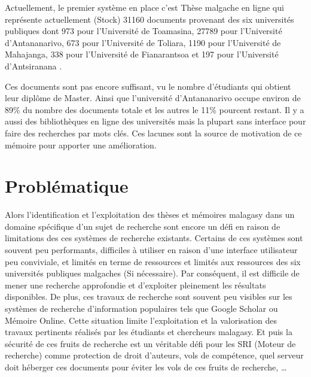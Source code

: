 Actuellement, le premier système en place c'est \og Thèse malgache en ligne \fg{} qui représente actuellement (Stock) 31160 documents provenant des six universités publiques dont 973 pour l'Université de Toamasina, 27789 pour l'Université d'Antananarivo, 673 pour l'Université de Toliara, 1190 pour l'Université de Mahajanga, 338 pour l'Université de Fianarantsoa et 197 pour l'Université d'Antsiranana \citep{these-malgache-en-ligne}.

Ces documents sont pas encore suffisant, vu le nombre d’étudiants qui obtient leur diplôme de Master. Ainsi que l'université d'Antananarivo occupe environ de 89\% du nombre des documents totale et les autres le 11\% pourcent restant. Il y a aussi des bibliothèques en ligne des universités mais la plupart sans interface pour faire des recherches par mots clés. Ces lacunes sont la source de motivation de ce mémoire pour apporter une amélioration.

\section*{Problématique}
Alors l'identification et l'exploitation des thèses et mémoires malagasy dans un domaine spécifique d'un sujet de recherche sont encore un défi en raison de limitations des ces systèmes de recherche existants. Certains de ces systèmes sont souvent peu performants, difficiles à utiliser en raison d'une interface utilisateur peu conviviale, et limités en terme de ressources et limités aux ressources des six universités publiques malgaches (Si nécessaire). Par conséquent, il est difficile de mener une recherche approfondie et d'exploiter pleinement les résultats disponibles. De plus, ces travaux de recherche sont souvent peu visibles sur les systèmes de recherche d'information populaires tels que Google Scholar ou Mémoire Online. Cette situation limite l'exploitation et la valorisation des travaux pertinents réalisés par les étudiants et chercheurs malagasy. Et puis la sécurité de ces fruits de recherche est un véritable défi pour les SRI (Moteur de recherche) comme protection de droit d'auteurs, vols de compétence, quel serveur doit héberger ces documents pour éviter les vols de ces fruits de recherche, \dots

